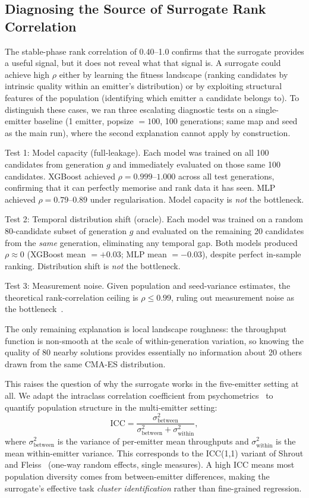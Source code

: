 \documentclass[conference]{IEEEtran}
\begin{document}
\subsection{Diagnosing the Source of Surrogate Rank Correlation}
\label{sec:population_structure}

The stable-phase rank correlation of 0.40--1.0 confirms that the
surrogate provides a useful signal, but it does not reveal what that
signal is. A surrogate could achieve high $\rho$ either by learning the
fitness landscape (ranking candidates by intrinsic quality within an
emitter's distribution) or by exploiting structural features of the
population (identifying which emitter a candidate belongs to). To
distinguish these cases, we ran three escalating diagnostic tests on a
single-emitter baseline (1 emitter, popsize $= 100$, 100 generations;
same map and seed as the main run), where the second explanation cannot
apply by construction.

Test 1: Model capacity (full-leakage).
Each model was trained on all 100 candidates from generation $g$ and
immediately evaluated on those same 100 candidates.
XGBoost achieved $\rho = 0.999$--$1.000$ across all test generations,
confirming that it can perfectly memorise and rank data it has seen.
MLP achieved $\rho = 0.79$--$0.89$ under regularisation.
Model capacity is \emph{not} the bottleneck.

Test 2: Temporal distribution shift (oracle).
Each model was trained on a random 80-candidate subset of generation $g$
and evaluated on the remaining 20 candidates from the \emph{same}
generation, eliminating any temporal gap.
Both models produced $\rho \approx 0$ (XGBoost mean $= +0.03$;
MLP mean $= -0.03$), despite perfect in-sample ranking.
Distribution shift is \emph{not} the bottleneck.

Test 3: Measurement noise.
Given population and seed-variance estimates, the theoretical
rank-correlation ceiling is $\rho \leq 0.99$, ruling out measurement
noise as the bottleneck~\cite{spearman1904}.

The only remaining explanation is local landscape roughness:
the throughput function is non-smooth at the scale of within-generation
variation, so knowing the quality of 80 nearby solutions provides
essentially no information about 20 others drawn from the same
CMA-ES distribution.

This raises the question of why the surrogate works in the five-emitter
setting at all.
We adapt the intraclass correlation coefficient from psychometrics~\cite{shrout1979}
to quantify population structure in the multi-emitter setting:
\begin{equation}
  \text{ICC} = \frac{\sigma^2_\text{between}}
    {\sigma^2_\text{between} + \sigma^2_\text{within}},
  \label{eq:icc}
\end{equation}
where $\sigma^2_\text{between}$ is the variance of per-emitter mean
throughputs and $\sigma^2_\text{within}$ is the mean within-emitter
variance. This corresponds to the ICC(1,1) variant of Shrout and
Fleiss~\cite{shrout1979} (one-way random effects, single measures).
A high ICC means most population diversity comes from between-emitter
differences, making the surrogate's effective task \emph{cluster
identification} rather than fine-grained regression.
\end{document}
